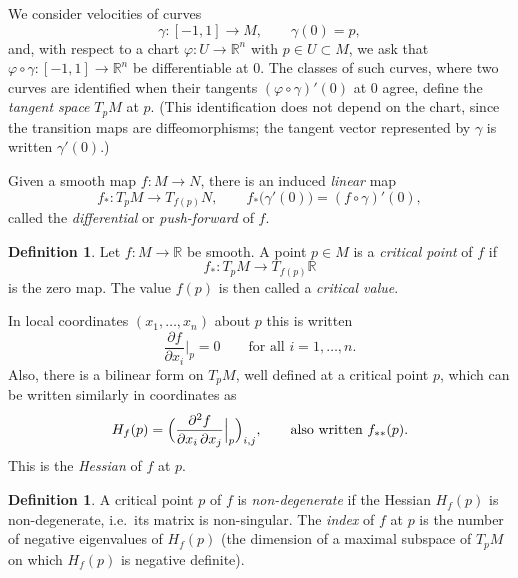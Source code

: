 \documentclass[11pt,openany]{book}
\theoremstyle{plain}
\theoremstyle{definition}
\newtheorem{definition}[theorem]{Definition}
\theoremstyle{remark}
\newcommand{\added}[1]{{\color{addcol}#1}}
\newcommand{\fixed}[1]{\marginpar{\raggedright\scriptsize\color{flagcol}\textbf{Fix:} #1}}
\newcommand{\R}{\mathbb{R}}
\begin{document}
\begin{center}
\end{center}

We consider velocities of curves
\[
  \gamma\colon[-1,1]\to M,\qquad \gamma(0)=p,
\]
and, with respect to a chart $\varphi\colon U\to\R^n$ with $p\in U\subset M$, we ask
that $\varphi\circ\gamma\colon[-1,1]\to\R^n$ be differentiable at $0$.
The classes of such curves, where two curves are identified when their tangents
\added{$(\varphi\circ\gamma)'(0)$} at $0$ agree, define the \emph{tangent space} $T_pM$ at $p$.
\added{(This identification does not depend on the chart, since the transition maps
are diffeomorphisms; the tangent vector represented by $\gamma$ is written $\gamma'(0)$.)}

Given a smooth map $f\colon M\to N$, there is an induced \emph{linear} map
\[
  f_*\colon T_pM\to T_{f(p)}N,\qquad f_*\bigl(\gamma'(0)\bigr)=(f\circ\gamma)'(0),
\]
\fixed{notes: target $T_pN$}
called the \emph{differential} or \emph{push-forward} of $f$.

\begin{definition}
\label{L9:def:critical}
Let $f\colon M\to\R$ be smooth. A point $p\in M$ is a \emph{critical point} of $f$ if
\[
  f_*\colon T_pM\to T_{f(p)}\R
\]
is the zero map. The value $f(p)$ is then called a \emph{critical value}.
\end{definition}

In local coordinates $(x_1,\dots,x_n)$ \added{about $p$} this is written
\[
  \frac{\partial f}{\partial x_i}\Big|_p = 0\qquad\text{for all } i=1,\dots,n .
\]
Also, there is a bilinear form \added{on $T_pM$, well defined at a critical point $p$,} which can be
written similarly in coordinates as
\[
  H_f(p)=\Bigl(\frac{\partial^2 f}{\partial x_i\,\partial x_j}\Big|_p\Bigr)_{i,j},
  \qquad\text{also written } f_{**}(p).
\]
This is the \emph{Hessian} of $f$ at $p$.

\begin{definition}
\label{L9:def:nondeg}
A critical point $p$ of $f$ is \emph{non-degenerate} if the Hessian $H_f(p)$ is
non-degenerate, i.e.\ its matrix is non-singular. The \emph{index} of $f$ at $p$ is the
number of negative eigenvalues of $H_f(p)$ \added{(the dimension of a maximal subspace of
$T_pM$ on which $H_f(p)$ is negative definite)}.
\end{definition}
\end{document}
